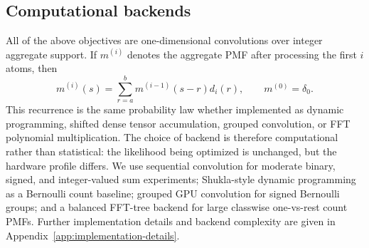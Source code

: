 \subsection{Computational backends}

All of the above objectives are one-dimensional convolutions over integer aggregate support.
If $m^{(i)}$ denotes the aggregate PMF after processing the first $i$ atoms, then
\begin{equation}
  m^{(i)}(s)
  =
  \sum_{r=a}^{b} m^{(i-1)}(s-r)d_i(r),
  \qquad
  m^{(0)}=\delta_0.
\end{equation}
This recurrence is the same probability law whether implemented as dynamic programming, shifted dense tensor accumulation, grouped convolution, or FFT polynomial multiplication.
The choice of backend is therefore computational rather than statistical: the likelihood being optimized is unchanged, but the hardware profile differs.
We use sequential convolution for moderate binary, signed, and integer-valued sum experiments; Shukla-style dynamic programming as a Bernoulli count baseline; grouped GPU convolution for signed Bernoulli groups; and a balanced FFT-tree backend for large classwise one-vs-rest count PMFs.
Further implementation details and backend complexity are given in Appendix~\ref{app:implementation-details}.
